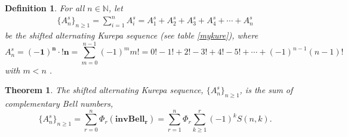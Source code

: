 \documentclass[pdflatex,sn-mathphys-num]{sn-jnl}%
\newtheorem{theorem}{Theorem}
\newtheorem{definition}{Definition}
\theoremstyle{thmstyleone}%
\theoremstyle{thmstyletwo}%
\theoremstyle{thmstylethree}%
\begin{document}
\begin{definition}\label{Alt}
    For all $n\in \mathbb{N}$, let  
    \begin{align*}
      \lbrace A_n^s\rbrace_{n\geq 1}=\sum_{i=1}^{n}A_i^s=A_1^s + A_2^s + A_3^s +A_4^s +\cdots + A_n^s
    \end{align*}
 be the shifted alternating Kurepa sequence (see table \ref{mykure}), 
where  $$A_n^s=\mathbf{(-1)^n\cdotp !n}=\sum_{m=0}^{n-1}(-1)^m m!= 0! - 1!+ 2! -3! + 4!- 5!  + \cdots +(-1)^{n-1}(n-1)!$$ with $m<n$ \cite{guy2004unsolved, weisstein2005alternating, zivkovic1999number, mijajlovic1990some}.
\end{definition}


\begin{theorem}\label{Aliter}
The shifted alternating Kurepa sequence, $\lbrace A_n^s\rbrace_{n\geq 1}$, is the sum of complementary Bell numbers,
$$  \lbrace A_n^s\rbrace_{n\geq 1}=\sum_{r=0}^{n}\Phi_r(\mathbf{invBell_r})= \sum_{r=1}^{n}\Phi_r \sum_{k\geq1}^{r} (-1)^kS(n,k). $$
\end{theorem}
\end{document}
